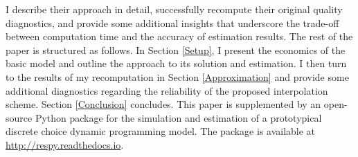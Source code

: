 I describe their approach in detail, successfully recompute their original quality diagnostics, and provide some additional insights that underscore the trade-off between computation time and the accuracy of estimation results. The rest of the paper is structured as follows. In Section \ref{Setup}, I present the economics of the basic model and outline the approach to its solution and estimation. I then turn to the results of my recomputation in Section \ref{Approximation} and provide some additional diagnostics regarding the reliability of the proposed interpolation scheme. Section \ref{Conclusion} concludes. This paper is supplemented by an open-source Python package for the simulation and estimation of a prototypical discrete choice dynamic programming model. The package is available at \url{http://respy.readthedocs.io}.
